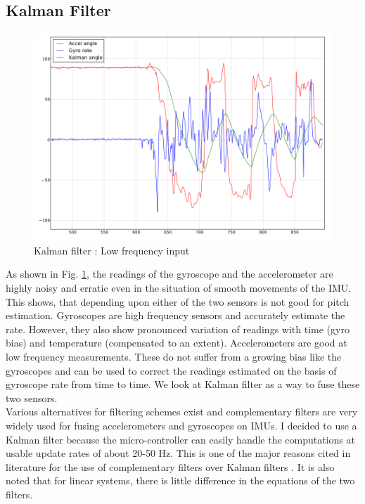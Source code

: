 \subsection{Kalman Filter}
\begin{figure}[!h]
\centering
\includegraphics[scale=1.4]{fig/kalman_lowfreq.pdf}
\caption{Kalman filter : Low frequency input}
\label{fig:5_kalman_lowfreq}
\end{figure}
As shown in Fig. \ref{fig:5_kalman_lowfreq}, the readings of the gyroscope and the accelerometer are highly noisy and erratic even
in the situation of smooth movements of the IMU. This shows, that depending upon either of the two sensors is not good for
pitch estimation. Gyroscopes are high frequency sensors and accurately estimate the rate. However, they also show pronounced
variation of 
readings with time (gyro bias) and temperature (compensated to an extent). Accelerometers are good at low frequency
measurements. These do not suffer from a growing bias like the gyroscopes and can be used to correct the
readings estimated on the basis of gyroscope rate from time to time. We look at Kalman filter as a way to fuse these two sensors.\\

Various alternatives for filtering schemes exist and complementary filters are very widely used for fusing accelerometers and 
gyroscopes on IMUs. I decided to use a Kalman filter because the micro-controller can easily handle the computations
at usable update rates of about 20-50 Hz. This is one of the major reasons cited in literature for the use of complementary
filters over Kalman filters \cite{kalman1975}. It is also noted that for linear systems, there is little difference in the equations
of the two filters.\\

